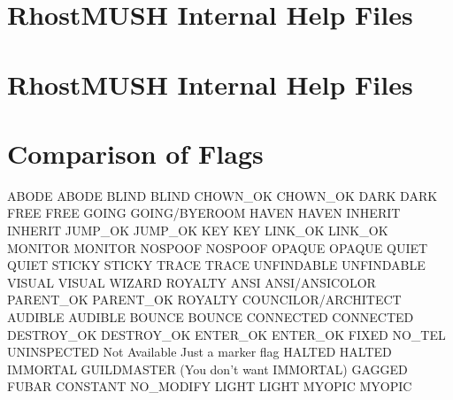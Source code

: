 \documentclass[letterpaper,10pt,english]{sphinxmanual}
\begin{document}
\sphinxAtStartPar
{}


\chapter{RhostMUSH Internal Help Files}
\label{\detokenize{helpfile:rhostmush-internal-help-files}}\label{\detokenize{helpfile::doc}}

\chapter{RhostMUSH Internal Help Files}
\label{\detokenize{wizhelpfile:rhostmush-internal-help-files}}\label{\detokenize{wizhelpfile::doc}}

\chapter{Comparison of Flags}
\label{\detokenize{flags:comparison-of-flags}}\label{\detokenize{flags::doc}}
\sphinxAtStartPar
ABODE           \sphinxhyphen{} ABODE
BLIND           \sphinxhyphen{} BLIND
CHOWN\_OK        \sphinxhyphen{} CHOWN\_OK
DARK            \sphinxhyphen{} DARK
FREE            \sphinxhyphen{} FREE
GOING           \sphinxhyphen{} GOING/BYEROOM
HAVEN           \sphinxhyphen{} HAVEN
INHERIT         \sphinxhyphen{} INHERIT
JUMP\_OK         \sphinxhyphen{} JUMP\_OK
KEY             \sphinxhyphen{} KEY
LINK\_OK         \sphinxhyphen{} LINK\_OK
MONITOR         \sphinxhyphen{} MONITOR
NOSPOOF         \sphinxhyphen{} NOSPOOF
OPAQUE          \sphinxhyphen{} OPAQUE
QUIET           \sphinxhyphen{} QUIET
STICKY          \sphinxhyphen{} STICKY
TRACE           \sphinxhyphen{} TRACE
UNFINDABLE      \sphinxhyphen{} UNFINDABLE
VISUAL          \sphinxhyphen{} VISUAL
WIZARD          \sphinxhyphen{} ROYALTY
ANSI            \sphinxhyphen{} ANSI/ANSICOLOR
PARENT\_OK       \sphinxhyphen{} PARENT\_OK
ROYALTY         \sphinxhyphen{} COUNCILOR/ARCHITECT
AUDIBLE         \sphinxhyphen{} AUDIBLE
BOUNCE          \sphinxhyphen{} BOUNCE
CONNECTED       \sphinxhyphen{} CONNECTED
DESTROY\_OK      \sphinxhyphen{} DESTROY\_OK
ENTER\_OK        \sphinxhyphen{} ENTER\_OK
FIXED           \sphinxhyphen{} NO\_TEL
UNINSPECTED     \sphinxhyphen{} Not Available \sphinxhyphen{} Just a marker flag
HALTED          \sphinxhyphen{} HALTED
IMMORTAL        \sphinxhyphen{} GUILDMASTER (You don’t want IMMORTAL)
GAGGED          \sphinxhyphen{} FUBAR
CONSTANT        \sphinxhyphen{} NO\_MODIFY
LIGHT           \sphinxhyphen{} LIGHT
MYOPIC          \sphinxhyphen{} MYOPIC
\end{document}
